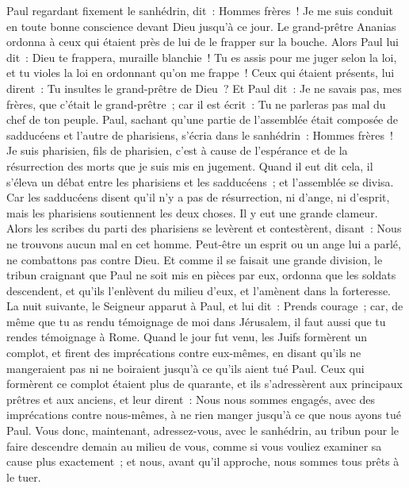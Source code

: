 \begin{multicols}{2}
\VerseOne{}Paul regardant fixement le sanhédrin, dit~: Hommes frères~! Je me suis conduit en toute bonne conscience devant Dieu jusqu'à ce jour.
Le grand-prêtre Ananias ordonna à ceux qui étaient près de lui de le frapper sur la bouche.
Alors Paul lui dit~: Dieu te frappera, muraille blanchie~! Tu es assis pour me juger selon la loi, et tu violes la loi en ordonnant qu'on me frappe~!
Ceux qui étaient présents, lui dirent~: Tu insultes le grand-prêtre de Dieu~?
Et Paul dit~: Je ne savais pas, mes frères, que c'était le grand-prêtre~; car il est écrit~: Tu ne parleras pas mal du chef de ton peuple.
Paul, sachant qu'une partie de l'assemblée était composée de sadducéens et l'autre de pharisiens, s'écria dans le sanhédrin~: Hommes frères~! Je suis pharisien, fils de pharisien, c'est à cause de l'espérance et de la résurrection des morts que je suis mis en jugement.
Quand il eut dit cela, il s'éleva un débat entre les pharisiens et les sadducéens~; et l'assemblée se divisa.
Car les sadducéens disent qu'il n'y a pas de résurrection, ni d'ange, ni d'esprit, mais les pharisiens soutiennent les deux choses.
Il y eut une grande clameur. Alors les scribes du parti des pharisiens se levèrent et contestèrent, disant~: Nous ne trouvons aucun mal en cet homme. Peut-être un esprit ou un ange lui a parlé, ne combattons pas contre Dieu.
Et comme il se faisait une grande division, le tribun craignant que Paul ne soit mis en pièces par eux, ordonna que les soldats descendent, et qu'ils l'enlèvent du milieu d'eux, et l'amènent dans la forteresse.
La nuit suivante, le Seigneur apparut à Paul, et lui dit~: Prends courage~; car, de même que tu as rendu témoignage de moi dans Jérusalem, il faut aussi que tu rendes témoignage à Rome.
Quand le jour fut venu, les Juifs formèrent un complot, et firent des imprécations contre eux-mêmes, en disant qu'ils ne mangeraient pas ni ne boiraient jusqu'à ce qu'ils aient tué Paul.
Ceux qui formèrent ce complot étaient plus de quarante,
et ils s'adressèrent aux principaux prêtres et aux anciens, et leur dirent~: Nous nous sommes engagés, avec des imprécations contre nous-mêmes, à ne rien manger jusqu'à ce que nous ayons tué Paul.
Vous donc, maintenant, adressez-vous, avec le sanhédrin, au tribun pour le faire descendre demain au milieu de vous, comme si vous vouliez examiner sa cause plus exactement~; et nous, avant qu'il approche, nous sommes tous prêts à le tuer.

\end{multicols}
